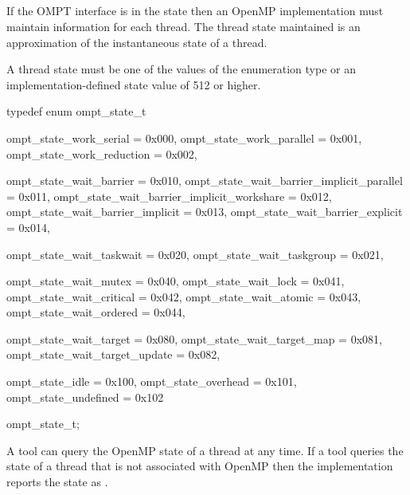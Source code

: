 \subsection{}
\label{sec:thread-states}
\label{sec:ompt_state_t}

\summary
If the OMPT interface is in the  state then an OpenMP implementation
must maintain  information for each thread. The thread 
state maintained is an approximation of the instantaneous state of a thread.

\format
\begin{ccppspecific}
A thread state must be one of the values of the enumeration type 
 or an implementation-defined state value of 512 or higher.

\begin{ompcEnum}
typedef enum ompt_state_t {
  ompt_state_work_serial                      = 0x000,
  ompt_state_work_parallel                    = 0x001,
  ompt_state_work_reduction                   = 0x002,

  ompt_state_wait_barrier                     = 0x010,
  ompt_state_wait_barrier_implicit_parallel   = 0x011,
  ompt_state_wait_barrier_implicit_workshare  = 0x012,
  ompt_state_wait_barrier_implicit            = 0x013,
  ompt_state_wait_barrier_explicit            = 0x014,

  ompt_state_wait_taskwait                    = 0x020,
  ompt_state_wait_taskgroup                   = 0x021,

  ompt_state_wait_mutex                       = 0x040,
  ompt_state_wait_lock                        = 0x041,
  ompt_state_wait_critical                    = 0x042,
  ompt_state_wait_atomic                      = 0x043,
  ompt_state_wait_ordered                     = 0x044,

  ompt_state_wait_target                      = 0x080,
  ompt_state_wait_target_map                  = 0x081,
  ompt_state_wait_target_update               = 0x082,

  ompt_state_idle                             = 0x100,
  ompt_state_overhead                         = 0x101,
  ompt_state_undefined                        = 0x102
} ompt_state_t;
\end{ompcEnum}
\end{ccppspecific}

\descr
A tool can query the OpenMP state of a thread at any time. If a 
tool queries the state of a thread that is not associated with OpenMP
then the implementation reports the state as .

